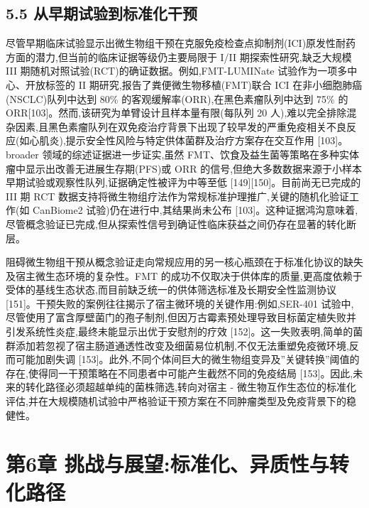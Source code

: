 \documentclass[11pt]{article}
\begin{document}
\subsection{5.5 从早期试验到标准化干预}\label{ux4eceux65e9ux671fux8bd5ux9a8cux5230ux6807ux51c6ux5316ux5e72ux9884}

尽管早期临床试验显示出微生物组干预在克服免疫检查点抑制剂(ICI)原发性耐药方面的潜力,但当前的临床证据等级仍主要局限于 I/II 期探索性研究,缺乏大规模 III 期随机对照试验(RCT)的确证数据。例如,FMT-LUMINate 试验作为一项多中心、开放标签的 II 期研究,报告了粪便微生物移植(FMT)联合 ICI 在非小细胞肺癌(NSCLC)队列中达到 80\% 的客观缓解率(ORR),在黑色素瘤队列中达到 75\% 的 ORR{[}103{]}。然而,该研究为单臂设计且样本量有限(每队列 20 人),难以完全排除混杂因素,且黑色素瘤队列在双免疫治疗背景下出现了较早发的严重免疫相关不良反应(如心肌炎),提示安全性风险与特定供体菌群及治疗方案存在交互作用 {[}103{]}。 broader 领域的综述证据进一步证实,虽然 FMT、饮食及益生菌等策略在多种实体瘤中显示出改善无进展生存期(PFS)或 ORR 的信号,但绝大多数数据来源于小样本早期试验或观察性队列,证据确定性被评为中等至低 {[}149{]}{[}150{]}。目前尚无已完成的 III 期 RCT 数据支持将微生物组疗法作为常规标准护理推广,关键的随机化验证工作(如 CanBiome2 试验)仍在进行中,其结果尚未公布 {[}103{]}。这种证据鸿沟意味着,尽管概念验证已完成,但从探索性信号到确证性临床获益之间仍存在显著的转化断层。

阻碍微生物组干预从概念验证走向常规应用的另一核心瓶颈在于标准化协议的缺失及宿主微生态环境的复杂性。FMT 的成功不仅取决于供体库的质量,更高度依赖于受体的基线生态状态,而目前缺乏统一的供体筛选标准及长期安全性监测协议 {[}151{]}。干预失败的案例往往揭示了宿主微环境的关键作用:例如,SER-401 试验中,尽管使用了富含厚壁菌门的孢子制剂,但因万古霉素预处理导致目标菌定植失败并引发系统性炎症,最终未能显示出优于安慰剂的疗效 {[}152{]}。这一失败表明,简单的菌群添加若忽视了宿主肠道通透性改变及细菌易位机制,不仅无法重塑免疫微环境,反而可能加剧失调 {[}153{]}。此外,不同个体间巨大的微生物组变异及''关键转换''阈值的存在,使得同一干预策略在不同患者中可能产生截然不同的免疫结局 {[}153{]}。因此,未来的转化路径必须超越单纯的菌株筛选,转向对宿主 - 微生物互作生态位的标准化评估,并在大规模随机试验中严格验证干预方案在不同肿瘤类型及免疫背景下的稳健性。

\section{第6章 挑战与展望:标准化、异质性与转化路径}\label{ux7b2c6ux7ae0-ux6311ux6218ux4e0eux5c55ux671bux6807ux51c6ux5316ux5f02ux8d28ux6027ux4e0eux8f6cux5316ux8defux5f84}
\end{document}
